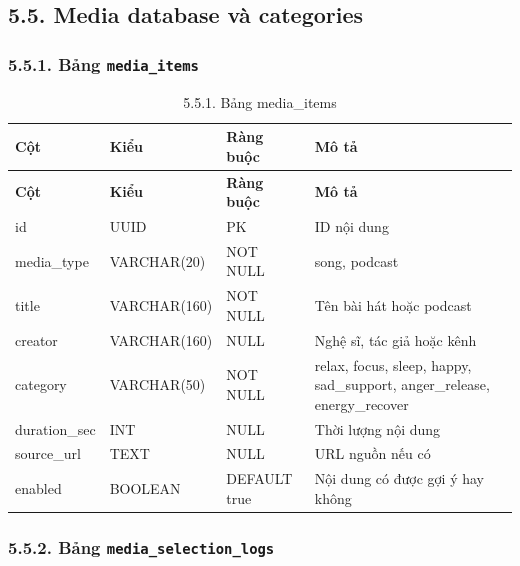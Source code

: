 \documentclass[12pt,a4paper]{article}
\begin{document}
\subsection*{5.5. Media database và categories}

\subsubsection*{5.5.1. Bảng \texttt{media\_items}}

\begin{center}
\scriptsize
\begin{longtable}{|P{0.18\textwidth}|P{0.25\textwidth}|P{0.25\textwidth}|P{0.22\textwidth}|}
\caption{5.5.1. Bảng media\_items}\\
\hline
\textbf{Cột} & \textbf{Kiểu} & \textbf{Ràng buộc} & \textbf{Mô tả} \\
\hline
\endfirsthead
\hline
\textbf{Cột} & \textbf{Kiểu} & \textbf{Ràng buộc} & \textbf{Mô tả} \\
\hline
\endhead
id & UUID & PK & ID nội dung \\
\hline
media\_type & VARCHAR(20) & NOT NULL & song, podcast \\
\hline
title & VARCHAR(160) & NOT NULL & Tên bài hát hoặc podcast \\
\hline
creator & VARCHAR(160) & NULL & Nghệ sĩ, tác giả hoặc kênh \\
\hline
category & VARCHAR(50) & NOT NULL & relax, focus, sleep, happy, sad\_support, anger\_release, energy\_recover \\
\hline
duration\_sec & INT & NULL & Thời lượng nội dung \\
\hline
source\_url & TEXT & NULL & URL nguồn nếu có \\
\hline
enabled & BOOLEAN & DEFAULT true & Nội dung có được gợi ý hay không \\
\hline
\end{longtable}
\normalsize
\end{center}

\subsubsection*{5.5.2. Bảng \texttt{media\_selection\_logs}}
\end{document}
